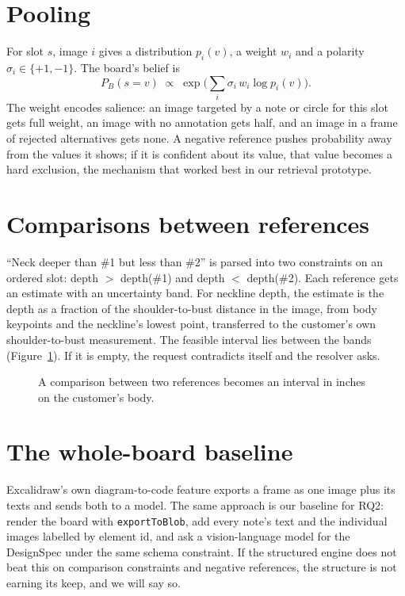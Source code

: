\section{Pooling}

For slot $s$, image $i$ gives a distribution $p_i(v)$, a weight $w_i$ and a polarity $\sigma_i\in\{+1,-1\}$. The board's belief is
\begin{equation}
P_B(s=v) \;\propto\; \exp\Big(\sum_i \sigma_i\, w_i \log p_i(v)\Big).
\end{equation}
The weight encodes salience: an image targeted by a note or circle for this slot gets full weight, an image with no annotation gets half, and an image in a frame of rejected alternatives gets none. A negative reference pushes probability away from the values it shows; if it is confident about its value, that value becomes a hard exclusion, the mechanism that worked best in our retrieval prototype.

\section{Comparisons between references}

``Neck deeper than \#1 but less than \#2'' is parsed into two constraints on an ordered slot: depth $>$ depth(\#1) and depth $<$ depth(\#2). Each reference gets an estimate with an uncertainty band. For neckline depth, the estimate is the depth as a fraction of the shoulder-to-bust distance in the image, from body keypoints and the neckline's lowest point, transferred to the customer's own shoulder-to-bust measurement. The feasible interval lies between the bands (Figure~\ref{fig:interval}). If it is empty, the request contradicts itself and the resolver asks.

\begin{figure}[h]
\centering
\caption{A comparison between two references becomes an interval in inches on the customer's body.}\label{fig:interval}
\end{figure}

\section{The whole-board baseline}

Excalidraw's own diagram-to-code feature exports a frame as one image plus its texts and sends both to a model. The same approach is our baseline for RQ2: render the board with \texttt{exportToBlob}, add every note's text and the individual images labelled by element id, and ask a vision-language model for the DesignSpec under the same schema constraint. If the structured engine does not beat this on comparison constraints and negative references, the structure is not earning its keep, and we will say so.

